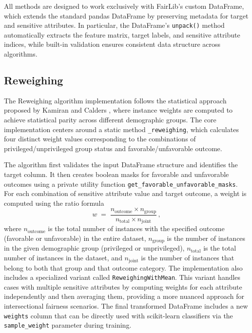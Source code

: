 \documentclass[12pt,a4paper,openright,twoside]{book}
\begin{document}
All methods are designed to work exclusively with FairLib’s custom DataFrame, which extends the standard pandas DataFrame by preserving metadata for target and sensitive attributes. In particular, the DataFrame’s \texttt{unpack()} method automatically extracts the feature matrix, target labels, and sensitive attribute indices, while built-in validation ensures consistent data structure across algorithms.

\subsection{Reweighing}
The Reweighing algorithm implementation follows the statistical approach proposed by Kamiran and Calders \cite{kamiran2013quantifying}, where instance weights are computed to achieve statistical parity across different demographic groups. The core implementation centers around a static method \texttt{\_reweighing}, which calculates four distinct weight values corresponding to the combinations of privileged/unprivileged group status and favorable/unfavorable outcome.

The algorithm first validates the input DataFrame structure and identifies the target column. It then creates boolean masks for favorable and unfavorable outcomes using a private utility function \texttt{get\_favorable\_unfavorable\_masks}. For each combination of sensitive attribute value and target outcome, a weight is computed using the ratio formula 
\[ 
w \;=\; \frac{n_{\text{outcome}} \times n_{\text{group}}}{\,n_{\text{total}} \times n_{\text{joint}}\,}\,,
\] 
where $n_{\text{outcome}}$ is the total number of instances with the specified outcome (favorable or unfavorable) in the entire dataset, $n_{\text{group}}$ is the number of instances in the given demographic group (privileged or unprivileged), $n_{\text{total}}$ is the total number of instances in the dataset, and $n_{\text{joint}}$ is the number of instances that belong to both that group and that outcome category. The implementation also includes a specialized variant called \texttt{ReweighingWithMean}. This variant handles cases with multiple sensitive attributes by computing weights for each attribute independently and then averaging them, providing a more nuanced approach for intersectional fairness scenarios. The final transformed DataFrame includes a new \texttt{weights} column that can be directly used with scikit-learn classifiers via the \texttt{sample\_weight} parameter during training.
\end{document}

